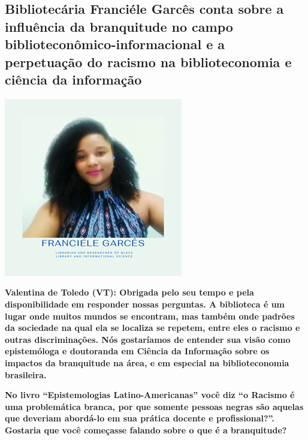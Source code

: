 \documentclass[a4paper,
fontsize=11pt,
oneside,
numbers=noperiodatend,
parskip=half-,
bibliography=totoc,
final
]{scrartcl}
\begin{document}
\hypertarget{bibliotecuxe1ria-franciuxe9le-garcuxeas-conta-sobre-a-influuxeancia-da-branquitude-no-campo-biblioteconuxf4mico-informacional-e-a-perpetuauxe7uxe3o-do-racismo-na-biblioteconomia-e-ciuxeancia-da-informauxe7uxe3o}{%
\subsection{Bibliotecária Franciéle Garcês conta sobre a influência
da branquitude no campo biblioteconômico-informacional e a perpetuação
do racismo na biblioteconomia e ciência da
informação}\label{bibliotecuxe1ria-franciuxe9le-garcuxeas-conta-sobre-a-influuxeancia-da-branquitude-no-campo-biblioteconuxf4mico-informacional-e-a-perpetuauxe7uxe3o-do-racismo-na-biblioteconomia-e-ciuxeancia-da-informauxe7uxe3o}}

\begin{center}
\includegraphics{img/img2.PNG}
\end{center}

\textbf{Valentina de Toledo (VT): Obrigada pelo seu tempo e pela
disponibilidade em responder nossas perguntas. A biblioteca é um lugar
onde muitos mundos se encontram, mas também onde padrões da sociedade na
qual ela se localiza se repetem, entre eles o racismo e outras
discriminações. Nós gostaríamos de entender sua visão como epistemóloga
e doutoranda em Ciência da Informação sobre os impactos da branquitude
na área, e em especial na biblioteconomia brasileira.}

\textbf{No livro \enquote{Epistemologias Latino-Americanas} você diz
\enquote{o Racismo é uma problemática branca, por que somente pessoas
negras são aquelas que deveriam abordá-lo em sua prática docente e
profissional?}. Gostaria que você começasse falando sobre o que é a
branquitude?}
\end{document}
